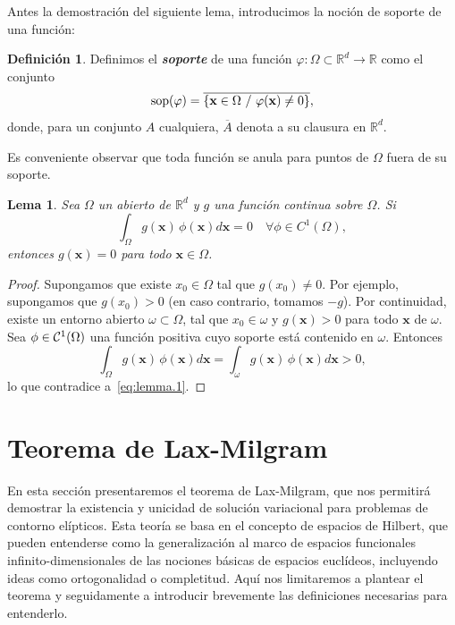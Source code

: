 \documentclass[11pt]{report}
\theoremstyle{plain}
\newtheorem{lemma}[theorem]{Lema}
\theoremstyle{definition}
\newtheorem{definition}[theorem]{Definición}
\newcommand{\deff}[1]{\textit{\textbf{#1}}}
\newcommand{\R}{\ensuremath{\mathbb{R}}}
\newcommand{\xx}{\ensuremath{\mathbf{x}}\xspace}
\newcommand{\classC}[2]{%
  \ensuremath{
   \ifthenelse{\equal{#2}{}}
    {\mathcal{C}^{#1}}
    {\mathcal{C}^{#1}(#2)}
  }
}
\begin{document}
Antes la demostración del siguiente lema, introducimos la noción de soporte de una función:
\begin{definition}
Definimos el \deff{soporte} de una función $\varphi:\Omega\subset\R^d\to\R $ como el conjunto
\[
  \mathop{\rm sop}(\varphi) = \overline{\{\xx\in\Omega \ /\ \varphi(\xx)\neq 0\}},
\]
donde, para un conjunto $A$ cualquiera, $\overline A$ denota a su clausura en $\R^d$. 
\end{definition}

Es conveniente observar que toda función se anula para puntos de $\Omega$ fuera de su soporte.


\begin{lemma}
  \label{lemma:1}
  Sea $\Omega$ un abierto de $\R^d$ y $g$ una función continua sobre $\Omega$. Si
  \begin{equation}
    \label{eq:lemma.1}
    \int_\Omega g(\xx)\,\phi(\xx) d\xx = 0 \quad\forall\phi\in C^1(\Omega),
  \end{equation}
  entonces $g(\xx)=0$ para todo $\xx\in\Omega$.
\end{lemma}

\begin{proof}
  Supongamos que existe $x_0\in\Omega$ tal que $g(x_0)\neq 0$. Por ejemplo, supongamos que $g(x_0) > 0$ (en caso contrario, tomamos $-g$). Por continuidad, existe un entorno abierto $\omega\subset\Omega$, tal que $x_0\in\omega$ y $g(\xx)>0$ para todo $\xx$ de $\omega$. Sea $\phi\in\classC1\Omega$ una función positiva cuyo soporte está contenido en $\omega$. Entonces 
  \[
    \int_\Omega g(\xx)\,\phi(\xx) d\xx =
    \int_\omega g(\xx)\,\phi(\xx) d\xx > 0, 
  \] 
  lo que contradice a~\eqref{eq:lemma.1}.

\end{proof}

\section{Teorema de Lax-Milgram}
En esta sección presentaremos el teorema de Lax-Milgram, que nos permitirá demostrar la existencia y unicidad de solución variacional para problemas de contorno elípticos. Esta teoría se basa en el concepto de espacios de Hilbert, que pueden entenderse como la generalización al marco de espacios funcionales infinito-dimensionales de las nociones básicas de espacios euclídeos, incluyendo ideas como ortogonalidad o completitud. Aquí nos limitaremos a plantear el teorema y seguidamente a introducir brevemente las definiciones necesarias para entenderlo. 
\end{document}
